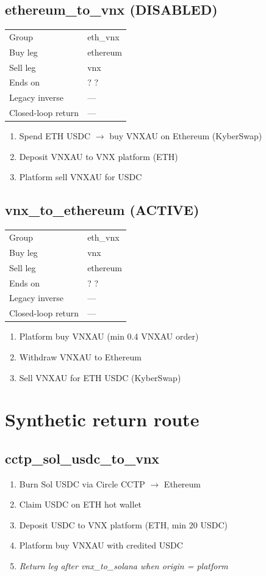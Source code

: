 \documentclass[11pt,a4paper]{article}
\begin{document}
\subsection*{\textcolor{warnred}{ethereum\_to\_vnx} (DISABLED)}
\begin{tabular}{@{}ll@{}}
Group & eth\_vnx \\
Buy leg & ethereum \\
Sell leg & vnx \\
Ends on & ? ? \\
Legacy inverse & — \\
Closed-loop return & — \\
\end{tabular}
\begin{enumerate}[nosep,leftmargin=*]
\item Spend ETH USDC $\rightarrow$ buy VNXAU on Ethereum (KyberSwap)
\item Deposit VNXAU to VNX platform (ETH)
\item Platform sell VNXAU for USDC
\end{enumerate}
\subsection*{\textcolor{okgreen}{vnx\_to\_ethereum} (ACTIVE)}
\begin{tabular}{@{}ll@{}}
Group & eth\_vnx \\
Buy leg & vnx \\
Sell leg & ethereum \\
Ends on & ? ? \\
Legacy inverse & — \\
Closed-loop return & — \\
\end{tabular}
\begin{enumerate}[nosep,leftmargin=*]
\item Platform buy VNXAU (min 0.4 VNXAU order)
\item Withdraw VNXAU to Ethereum
\item Sell VNXAU for ETH USDC (KyberSwap)
\end{enumerate}
\section*{Synthetic return route}
\subsection*{cctp\_sol\_usdc\_to\_vnx}
\begin{enumerate}[nosep,leftmargin=*]
\item Burn Sol USDC via Circle CCTP $\rightarrow$ Ethereum
\item Claim USDC on ETH hot wallet
\item Deposit USDC to VNX platform (ETH, min 20 USDC)
\item Platform buy VNXAU with credited USDC
\item \textit{Return leg after vnx\_to\_solana when origin = platform}
\end{enumerate}
\end{document}
